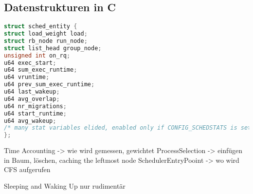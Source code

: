 \subsection{Datenstrukturen in C}\label{s:cstructs}
\begin{lstlisting}[language=C]
struct sched_entity {
struct load_weight load;
struct rb_node run_node;
struct list_head group_node;
unsigned int on_rq;
u64 exec_start;
u64 sum_exec_runtime;
u64 vruntime;
u64 prev_sum_exec_runtime;
u64 last_wakeup;
u64 avg_overlap;
u64 nr_migrations;
u64 start_runtime;
u64 avg_wakeup;
/* many stat variables elided, enabled only if CONFIG_SCHEDSTATS is set */
};
\end{lstlisting}


Time Accounting -> wie wird gemessen, gewichtet
ProcessSelection -> einfügen in Baum, löschen, caching the leftmost node
SchedulerEntryPooint -> wo wird CFS aufgerufen

Sleeping and Waking Up nur rudimentär
